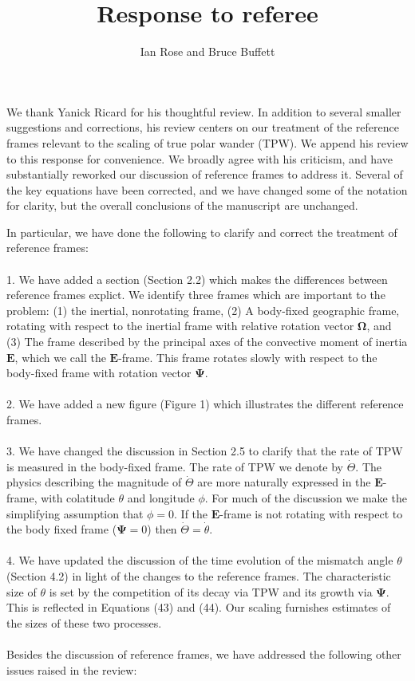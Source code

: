 \documentclass[a4paper,12pt]{article}
\title{Response to referee}
\author{Ian Rose and Bruce Buffett}
\date{}
\begin{document}
\maketitle

We thank Yanick Ricard for his thoughtful review.
In addition to several smaller suggestions and corrections,
his review centers on our treatment of the reference frames relevant to the scaling of true polar wander (TPW).
We append his review to this response for convenience.
We broadly agree with his criticism, and have substantially reworked our discussion of reference frames to address it.
Several of the key equations have been corrected, and we have changed some of the notation for clarity,
but the overall conclusions of the manuscript are unchanged.

In particular, we have done the following to clarify and correct the treatment of reference frames:
\\
\\
1. We have added a section (Section 2.2) which makes the differences between reference frames explict.
We identify three frames which are important to the problem: 
(1) the inertial, nonrotating frame, 
(2) A body-fixed geographic frame, rotating with respect to the inertial frame with relative rotation vector $\mathbf{\Omega}$, and
(3) The frame described by the principal axes of the convective moment of inertia $\mathbf{E}$, which we call the $\mathbf{E}$-frame.
This frame rotates slowly with respect to the body-fixed frame with rotation vector $\mathbf{\Psi}$.
\\
\\
2. We have added a new figure (Figure 1) which illustrates the different reference frames.
\\
\\
3. We have changed the discussion in Section 2.5 to clarify that the rate of TPW is measured in the body-fixed frame.
The rate of TPW we denote by $\dot{\Theta}$. The physics describing the magnitude of $\dot{\Theta}$ are 
more naturally expressed in the $\mathbf{E}$-frame, with colatitude $\theta$ and longitude $\phi$. 
For much of the discussion we make the simplifying assumption that $\phi=0$.
If the $\mathbf{E}$-frame is not rotating with respect to the body fixed frame ($\mathbf{\Psi}=0$) then $\dot{\Theta} = \dot{\theta}$.
\\
\\
4. We have updated the discussion of the time evolution of the mismatch angle $\theta$ (Section 4.2)
in light of the changes to the reference frames. The characteristic size of $\theta$ is set by 
the competition of its decay via TPW and its growth via $\mathbf{\Psi}$.
This is reflected in Equations (43) and (44).
Our scaling furnishes estimates of the sizes of these two processes.
\\
\\
Besides the discussion of reference frames, we have addressed the following other issues raised in the review:
\end{document}
